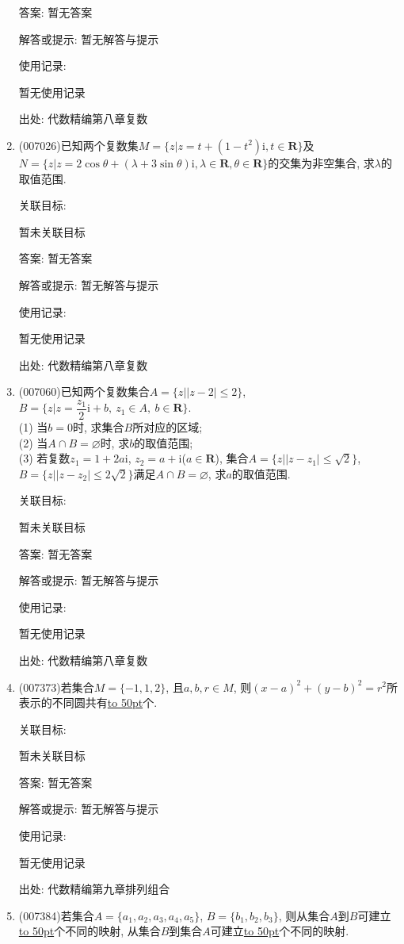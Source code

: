 \documentclass[10pt,a4paper]{article}
\newcommand{\blank}[1]{\underline{\hbox to #1pt{}}}
\begin{document}
\begin{enumerate}[1.]
答案: 暂无答案

解答或提示: 暂无解答与提示

使用记录:

暂无使用记录


出处: 代数精编第八章复数
\item { (007026)}已知两个复数集$M=\{z|z=t+(1-t^2)\mathrm{i}, t\in \mathbf{R}\}$及$N=\{z|z=2\cos \theta +(\lambda +3\sin \theta)\mathrm{i},\lambda \in \mathbf{R},\theta \in \mathbf{R}\}$的交集为非空集合, 求$\lambda$的取值范围.


关联目标:

暂未关联目标

答案: 暂无答案

解答或提示: 暂无解答与提示

使用记录:

暂无使用记录


出处: 代数精编第八章复数
\item { (007060)}已知两个复数集合$A=\{z||z-2|\le 2\}$, $B=\{z|z=\dfrac{z_1}2\mathrm{i}+b, \ z_1\in A, \ b\in \mathbf{R}\}$.\\
(1) 当$b=0$时, 求集合$B$所对应的区域;\\
(2) 当$A\cap B=\varnothing$时, 求$b$的取值范围;\\
(3) 若复数$z_1=1+2a\mathrm{i}$, $z_2=a+\mathrm{i}$($a\in \mathbf{R}$), 集合$A=\{z||z-z_1|\le \sqrt 2\}$, $B=\{z||z-z_2|\le 2\sqrt 2\}$满足$A\cap B=\varnothing$, 求$a$的取值范围.


关联目标:

暂未关联目标

答案: 暂无答案

解答或提示: 暂无解答与提示

使用记录:

暂无使用记录


出处: 代数精编第八章复数
\item { (007373)}若集合$M=\{-1,1,2\}$, 且$a,b,r\in M$, 则$(x-a)^2+(y-b)^2=r^2$所表示的不同圆共有\blank{50}个.


关联目标:

暂未关联目标

答案: 暂无答案

解答或提示: 暂无解答与提示

使用记录:

暂无使用记录


出处: 代数精编第九章排列组合
\item { (007384)}若集合$A=\{a_1,a_2,a_3,a_4,a_5\}$, $B=\{b_1,b_2,b_3\}$, 则从集合$A$到$B$可建立\blank{50}个不同的映射, 从集合$B$到集合$A$可建立\blank{50}个不同的映射.



\end{enumerate}
\end{document}
